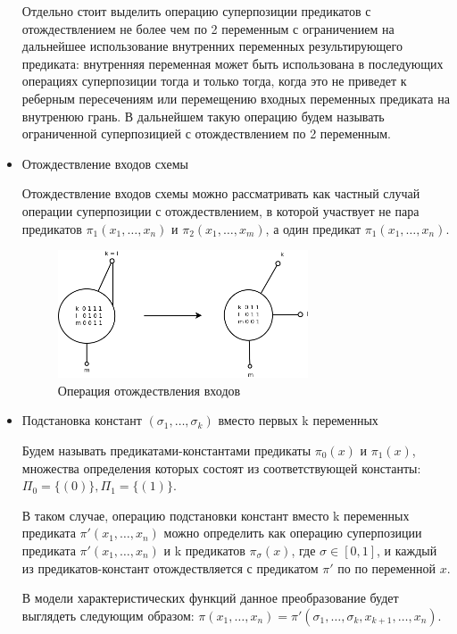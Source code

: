 \documentclass[12pt]{article}
\begin{document}
\begin{itemize}
    Отдельно стоит выделить операцию суперпозиции предикатов с отождествлением не более чем по 2 переменным с
    ограничением на дальнейшее использование внутренних переменных результирующего предиката: внутренняя переменная
    может быть использована в последующих операциях суперпозиции тогда и только тогда, когда это не приведет
    к реберным пересечениям или перемещению входных переменных предиката на внутренюю грань. В дальнейшем такую операцию
    будем называть ограниченной суперпозицией с отождествлением по 2 переменным.
    
    \item Отождествление входов схемы
    
    Отождествление входов схемы можно рассматривать как частный случай операции суперпозиции с отождествлением, в 
    которой участвует не пара предикатов $\pi_1(x_1, \dots, x_n)$ и $\pi_2(x_1, \dots, x_m)$, а один предикат 
    $\pi_1(x_1, \dots, x_n)$.

    \begin{figure}[htb]
    \centering
    \includegraphics[width=0.7\textwidth]{join_ins_op.png}
    \caption{Операция отождествления входов}
    \label{fig:join_ins_op}
    \samepage
    \end{figure}

    \item Подстановка констант $(\sigma_1, \dots, \sigma_k)$ вместо первых k переменных

    Будем называть предикатами-константами предикаты $\pi_0(x)$ и $\pi_1(x)$, множества определения которых состоят
    из соответствующей константы: $\Pi_0=\{ (0) \}, \Pi_1=\{ (1) \}$.

    В таком случае, операцию подстановки констант вместо k переменных предиката $\pi'(x_1, \dots, x_n)$ 
    можно определить как операцию суперпозиции предиката $\pi'(x_1, \dots, x_n)$ и k предикатов 
    $\pi_{\sigma}(x)$, где $\sigma \in [0,1]$, и каждый из предикатов-констант отождествляется с предикатом $\pi'$ по
    по переменной $x$.

    В модели характеристических функций данное преобразование будет выглядеть следующим образом:
    $\pi(x_1, \dots, x_n) = \pi'(\sigma_1, \dots, \sigma_k, x_{k+1}, \dots, x_n)$. 
    

\end{itemize}
\end{document}
